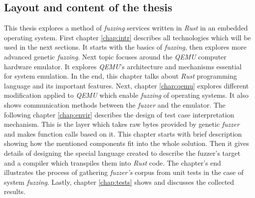 \subsection{Layout and content of the thesis}
This thesis explores a method of \textit{fuzzing} services written in \textit{Rust} in an embedded operating system. First chapter \ref{chap:intr} describes all technologies which will be used in the next sections. It starts with the basics of \textit{fuzzing}, then explores more advanced genetic \textit{fuzzing}. Next topic focuses around the \textit{QEMU} computer hardware emulator. It explores \textit{QEMU}'s architecture and mechanisms essential for system emulation. In the end, this chapter talks about \textit{Rust} programming language and its important features. Next, chapter \ref{chap:qemu} explores different modification applied to \textit{QEMU} which enable \textit{fuzzing} of operating systems. It also shows communication methods between the \textit{fuzzer} and the emulator. The following chapter \ref{chap:envir} describes the design of test case interpretation mechanism. This is the layer which takes raw bytes provided by genetic \textit{fuzzer} and makes function calls based on it. This chapter starts with brief description showing how the mentioned components fit into the whole solution. Then it gives details of designing the special language created to describe the fuzzer's target and a compiler which transpiles them into \textit{Rust} code. The chapter's end illustrates the process of gathering \textit{fuzzer's} corpus from unit tests in the case of system \textit{fuzzing}. Lastly, chapter \ref{chap:tests} shows and discusses the collected results.